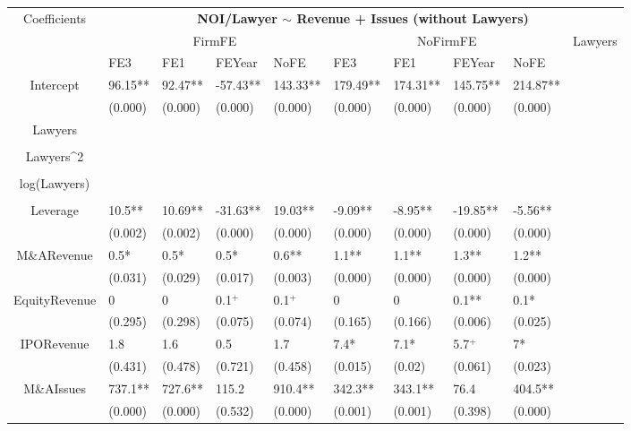 \documentclass{article}
\begin{document}
\begin{table}[H]
\centering
\begin{tabular}{|clllllllll|}
\hline
\multirow{3}{*}{Coefficients} & \multicolumn{9}{c|}{\textbf{NOI/Lawyer $\sim$ Revenue + Issues (without Lawyers)}} \\
\cline{2-10}
& \multicolumn{4}{c}{FirmFE} & \multicolumn{4}{c}{NoFirmFE} & \multirow{2}{*}{Lawyers} \\
\cline{2-9}
& FE3 & FE1 & FEYear & NoFE & FE3 & FE1 & FEYear & NoFE &  \\
\hline
 
Intercept & 96.15** & 92.47** & -57.43** & 143.33** & 179.49** & 174.31** & 145.75** & 214.87** & \\ 
   & (0.000) & (0.000) & (0.000) & (0.000) & (0.000) & (0.000) & (0.000) & (0.000) & \\ 
  Lawyers &  &  &  &  &  &  &  &  & \\ 
   &  &  &  &  &  &  &  &  & \\ 
  Lawyers^2 &  &  &  &  &  &  &  &  & \\ 
   &  &  &  &  &  &  &  &  & \\ 
  log(Lawyers) &  &  &  &  &  &  &  &  & \\ 
   &  &  &  &  &  &  &  &  & \\ 
  Leverage & 10.5** & 10.69** & -31.63** & 19.03** & -9.09** & -8.95** & -19.85** & -5.56** & \\ 
   & (0.002) & (0.002) & (0.000) & (0.000) & (0.000) & (0.000) & (0.000) & (0.000) & \\ 
  M\&ARevenue & 0.5* & 0.5* & 0.5* & 0.6** & 1.1** & 1.1** & 1.3** & 1.2** & \\ 
   & (0.031) & (0.029) & (0.017) & (0.003) & (0.000) & (0.000) & (0.000) & (0.000) & \\ 
  EquityRevenue & 0 & 0 & 0.1$^{+}$ & 0.1$^{+}$ & 0 & 0 & 0.1** & 0.1* & \\ 
   & (0.295) & (0.298) & (0.075) & (0.074) & (0.165) & (0.166) & (0.006) & (0.025) & \\ 
  IPORevenue & 1.8 & 1.6 & 0.5 & 1.7 & 7.4* & 7.1* & 5.7$^{+}$ & 7* & \\ 
   & (0.431) & (0.478) & (0.721) & (0.458) & (0.015) & (0.02) & (0.061) & (0.023) & \\ 
  M\&AIssues & 737.1** & 727.6** & 115.2 & 910.4** & 342.3** & 343.1** & 76.4 & 404.5** & \\ 
   & (0.000) & (0.000) & (0.532) & (0.000) & (0.001) & (0.001) & (0.398) & (0.000) & \\ 

\end{tabular}
\end{table}
\end{document}

